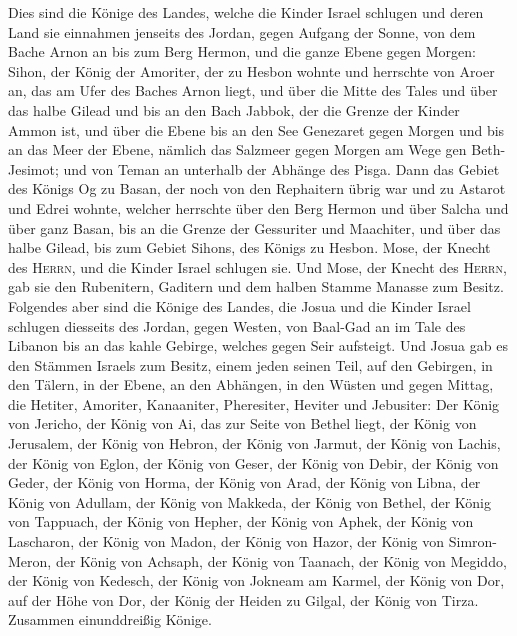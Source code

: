  Dies sind die Könige des Landes, welche die Kinder Israel
schlugen und deren Land sie einnahmen jenseits des Jordan, gegen Aufgang
der Sonne, von dem Bache Arnon an bis zum Berg Hermon, und die ganze
Ebene gegen Morgen:  Sihon, der König der Amoriter, der zu
Hesbon wohnte und herrschte von Aroer an, das am Ufer des Baches Arnon
liegt, und über die Mitte des Tales und über das halbe Gilead und bis an
den Bach Jabbok, der die Grenze der Kinder Ammon ist,  und
über die Ebene bis an den See Genezaret gegen Morgen und bis an das Meer
der Ebene, nämlich das Salzmeer gegen Morgen am Wege gen Beth-Jesimot;
und von Teman an unterhalb der Abhänge des Pisga.  Dann
das Gebiet des Königs Og zu Basan, der noch von den Rephaitern übrig war
und zu Astarot und Edrei wohnte,  welcher herrschte über
den Berg Hermon und über Salcha und über ganz Basan, bis an die Grenze
der Gessuriter und Maachiter, und über das halbe Gilead, bis zum Gebiet
Sihons, des Königs zu Hesbon.  Mose, der Knecht des
\textsc{Herrn}, und die Kinder Israel schlugen sie. Und Mose, der Knecht
des \textsc{Herrn}, gab sie den Rubenitern, Gaditern und dem halben
Stamme Manasse zum Besitz.  Folgendes aber sind die Könige
des Landes, die Josua und die Kinder Israel schlugen diesseits des
Jordan, gegen Westen, von Baal-Gad an im Tale des Libanon bis an das
kahle Gebirge, welches gegen Seir aufsteigt. Und Josua gab es den
Stämmen Israels zum Besitz, einem jeden seinen Teil,  auf
den Gebirgen, in den Tälern, in der Ebene, an den Abhängen, in den
Wüsten und gegen Mittag, die Hetiter, Amoriter, Kanaaniter, Pheresiter,
Heviter und Jebusiter:  Der König von Jericho, der König
von Ai, das zur Seite von Bethel liegt,  der König von
Jerusalem, der König von Hebron,  der König von Jarmut,
der König von Lachis,  der König von Eglon, der König von
Geser,  der König von Debir, der König von Geder,
 der König von Horma, der König von Arad, 
der König von Libna,  der König von Adullam, der König
von Makkeda,  der König von Bethel, der König von
Tappuach, der König von Hepher,  der König von Aphek, der
König von Lascharon,  der König von Madon,
 der König von Hazor, der König von Simron-Meron, der
König von Achsaph,  der König von Taanach, der König von
Megiddo,  der König von Kedesch, der König von Jokneam am
Karmel,  der König von Dor, auf der Höhe von Dor, der
König der Heiden zu Gilgal, der König von Tirza. 
Zusammen einunddreißig Könige.

